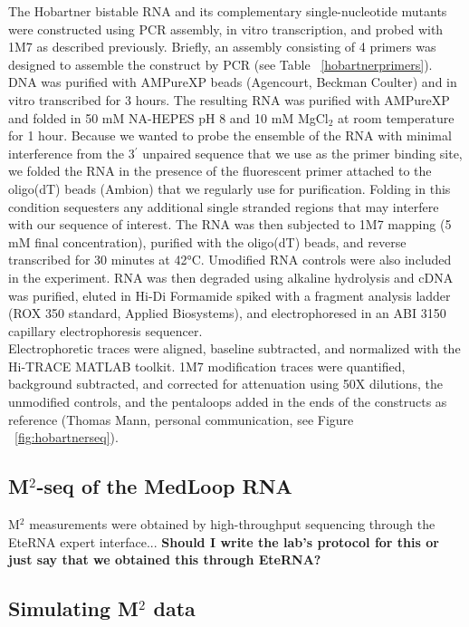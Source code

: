 \documentclass[12pt]{article}
\begin{document}
The Hobartner bistable RNA and its complementary single-nucleotide mutants were constructed using PCR assembly, in vitro transcription, and probed with 1M7 as described previously. 
Briefly, an assembly consisting of 4 primers was designed to assemble the construct by PCR (see Table ~\ref{hobartnerprimers}). 
DNA was purified with AMPureXP beads (Agencourt, Beckman Coulter) and in vitro transcribed for 3 hours. 
The resulting RNA was purified with AMPureXP and folded in 50 mM NA-HEPES pH 8 and 10 mM MgCl$_{2}$ at room temperature for 1 hour. 
Because we wanted to probe the ensemble of the RNA with minimal interference from the 3$^{\prime}$ unpaired sequence that we use as the primer binding site, we folded the RNA in the presence of the fluorescent primer attached to the oligo(dT) beads (Ambion) that we regularly use for purification. 
Folding in this condition sequesters any additional single stranded regions that may interfere with our sequence of interest. 
The RNA was then subjected to 1M7 mapping (5 mM final concentration), purified with the oligo(dT) beads, and reverse transcribed for 30 minutes at 42°C. Umodified RNA controls were also included in the experiment. 
RNA was then degraded using alkaline hydrolysis and cDNA was purified, eluted in Hi-Di Formamide spiked with a fragment analysis ladder (ROX 350 standard, Applied Biosystems), and electrophoresed in an ABI 3150 capillary electrophoresis sequencer. \\
Electrophoretic traces were aligned, baseline subtracted, and normalized with the Hi-TRACE MATLAB toolkit. 1M7 modification traces were quantified, background subtracted, and corrected for attenuation using 50X dilutions, the unmodified controls, and the pentaloops added in the ends of the constructs as reference (Thomas Mann, personal communication, see Figure ~\ref{fig:hobartnerseq}).

\subsection{M$^2$-seq of the MedLoop RNA}
M$^2$ measurements were obtained by high-throughput sequencing through the EteRNA expert interface... \textbf{Should I write the lab's protocol for this or just say that we obtained this through EteRNA?}

\subsection{Simulating M$^2$ data}
\end{document}
